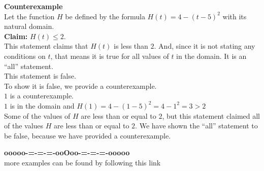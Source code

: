 \documentclass{ximera}
\begin{document}
\begin{example}    \textbf{\textcolor{blue!55!black}{Counterexample}} \\



Let the function $H$ be defined by the formula $H(t) = 4 - (t-5)^2$ with its natural domain. \\

\textbf{\textcolor{blue!55!black}{Claim:}} $H(t) \leq 2$.  \\



This statement claims that $H(t)$ is less than $2$.  And, since it is not stating any conditions on $t$, that means it is true for all values of $t$ in the domain.  It is an ``all'' statement. \\

This statement is false. \\

To show it is false, we provide a counterexample. \\ 


$1$ is a counterexample. \\


$1$ is in the domain and  $H(1) = 4 - (1-5)^2 = 4 - 1^2 = 3 > 2$ \\



Some of the values of $H$ are less than or equal to $2$, but this statement claimed all of the values $H$ are less than or equal to $2$.  We have shown the ``all'' statement to be false, because we have provided a counterexample.



\end{example}







\begin{onlineOnly}
\begin{center}
\textbf{\textcolor{green!50!black}{ooooo-=-=-=-ooOoo-=-=-=-ooooo}} \\

more examples can be found by following this link\\ 

\end{center}
\end{onlineOnly}
\end{document}
